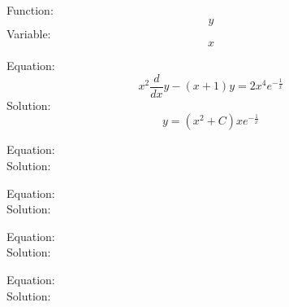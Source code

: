 \documentclass{article}
\begin{document}
Function:
$$
y
$$
Variable:
$$
x
$$



Equation:
$$
x^2 \frac{d}{dx}y-(x+1)y=2x^4 e^{-\frac{1}{x}}
$$
Solution:
$$
y=(x^2+C)xe^{-\frac{1}{x}}
$$

Equation:
$$
$$
Solution:
$$
$$

Equation:
$$
$$
Solution:
$$
$$

Equation:
$$
$$
Solution:
$$
$$

Equation:
$$
$$
Solution:
$$
$$
\end{document}
